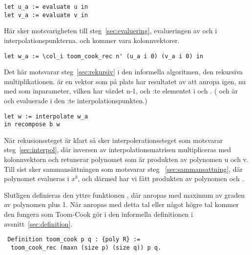\begin{lstlisting}
let u_a := evaluate u in
let v_a := evaluate v in
\end{lstlisting}

Här sker motsvarigheten till steg~\ref{sec:evaluering}, evalueringen av 
och  i interpolationspunkterna.  och  kommer vara
kolonnvektorer.

\begin{lstlisting}
let w_a := \col_i toom_cook_rec n' (u_a i 0) (v_a i 0) in
\end{lstlisting}

Det här motsvarar steg~\ref{sec:rekursiv} i den informella algoritmen, den
rekursiva multiplikationen.  är en vektor som på plats  har
resultatet av att anropa  igen, nu med  som inparameter,
vilken har värdet n-1, och :te elementet i  och . ( och  är  och  evaluerade i den :te
interpolationspunkten.)
\begin{lstlisting}
let w := interpolate w_a
in recompose b w
\end{lstlisting}
När rekusionssteget är klart så sker interpolerationssteget som motsvarar
steg~\ref{sec:interpol}, där inversen av interpolationsmatrisen multipliceras
med kolonnvektorn  och retunerar polynomet  som är produkten av
polynomen u och v. Till sist sker sammansättningen som motsvarar steg~
\ref{sec:sammansattning}, där polynomet  evalueras i $x^b$, och därmed har
vi fått produkten av polynomen  och .

Slutligen definieras den yttre funktionen , där 
anropas med maximum av graden av polynomen plus 1. När 
anropas med detta tal eller något högre tal kommer den fungera som Toom-Cook
gör i den informella definitionen i avsnitt~\ref{sec:definition}.
\begin{lstlisting}
 Definition toom_cook p q : {poly R} :=
  toom_cook_rec (maxn (size p) (size q)) p q.
\end{lstlisting}
